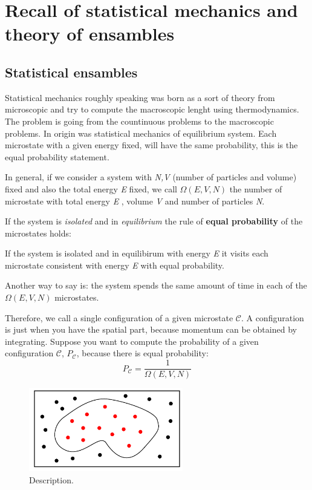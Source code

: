 \documentclass[../main/main.tex]{subfiles}
\begin{document}
\chapter{Recall of statistical mechanics and theory of ensambles}

\section{Statistical ensambles}
Statistical mechanics roughly speaking was born as a sort of theory from microscopic and try to compute the macroscopic lenght using thermodynamics. The problem is going from the countinuous problems to the macroscopic problems. In origin was statistical mechanics of equilibrium system. Each microstate with a given energy fixed, will have the same probability, this is the equal probability statement.

In general, if we consider a system with \emph{N,V} (number of particles and volume) fixed and also the total energy \emph{E} fixed, we call \( \Omega (E,V,N) \)  the number of microstate with total energy \emph{E} , volume \emph{V} and number of particles \emph{N}.

If the system is \emph{isolated} and in \emph{equilibrium} the rule of \textbf{equal probability} of the microstates holds:
\begin{orangebox}
If the system is isolated and in equilibirum with energy \emph{E} it visits each microstate consistent with energy \emph{E} with equal probability.
\end{orangebox}
Another way to say is: the system spends the same amount of time in each of the \( \Omega (E,V,N) \) microstates.

Therefore, we call  a single configuration of a given microstate \( \mathcal{C}  \). A configuration is just when you have the spatial part, because momentum can be obtained by integrating.
Suppose you want to compute the probability of a given configuration \( \mathcal{C}  \), \( P_{\mathcal{C}} \), because there is equal probability:
\begin{equation}
  P_{\mathcal{C}} = \frac{1}{\Omega (E,V,N)}
  \label{eq:}
\end{equation}


\begin{figure}[h!]
\centering
\includegraphics[width=0.6\textwidth]{../lessons/4_image/1.pdf}
\caption{\label{fig:4_1} Description.}
\end{figure}
\end{document}
